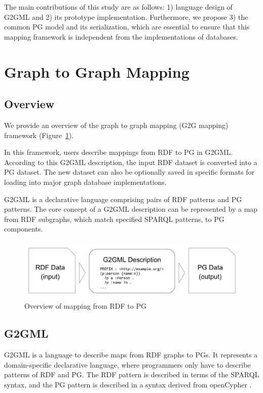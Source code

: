 \documentclass[runningheads]{llncs}
\begin{document}
The main contributions of this study are as follows: 1) language design of G2GML and 2) its prototype implementation. Furthermore, we propose 3) the common PG model and its serialization, which are essential to ensure that this mapping framework is independent from the implementations of databases.


\section{Graph to Graph Mapping}

\subsection{Overview}

We provide an overview of the graph to graph mapping (G2G mapping) framework (Figure~\ref{fig:dataflow}).

In this framework, users describe mappings from RDF to PG in G2GML.
According to this G2GML description, the input RDF dataset is converted into a PG dataset. The new dataset can also be optionally saved in specific formats for loading into major graph database implementations.

G2GML is a declarative language comprising pairs of RDF patterns and PG patterns. 
The core concept of a G2GML description can be represented by a map from RDF subgraphs, which match specified SPARQL patterns, to PG components.

 
\begin{figure}
\center
\includegraphics[width=1.0\textwidth]{dataflow.jpg}
\caption{Overview of mapping from RDF to PG}
\label{fig:dataflow}
\end{figure}


\subsection{G2GML}

G2GML is a language to describe maps from RDF graphs to PGs. It represents a domain-specific declarative language, where programmers only have to describe patterns of RDF and PG. The RDF pattern is described in terms of the SPARQL syntax, and the PG pattern is described in a syntax derived from openCypher \cite{openCypher}.
\end{document}
